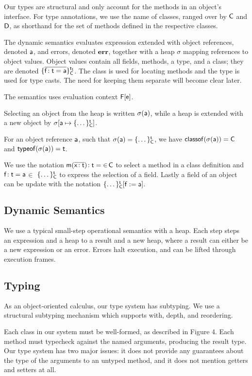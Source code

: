 \documentclass[preprint]{sigplanconf}
\newcommand{\m}{\M{\xt{m}}}
\newcommand{\e}{\M{\xt{e}}}
\newcommand{\f}{\M{\xt{f}}}
\newcommand{\x}{\M{\xt{x}}}
\renewcommand{\t}{\M{\xt{t}}}
\newcommand{\C}{\M{\xt{C}}}
\newcommand{\D}{\M{\xt{D}}}
\newcommand{\err}{\M{\bt{err}}}
\newcommand{\s}{\M{\sigma}}
\renewcommand{\a}{\M{\xt a}}
\newcommand{\F}{\M{\xt F}}
\newcommand{\tp}[1]{\M{ \t_{#1} }}
\newcommand{\HT}[2]{\M{{#1}\!:{#2}}}
\newcommand{\Mdef}[5]{\M{ \HT { #1( \b{\HT{#2}{#3}})}{#4}={#5}}}
\newcommand{\Fdef}[3]{\M{ \HT{#1}{#2}={#3} }}
\newcommand{\is}{\M{\mapsto}}
\newcommand{\Obj}[3]{ \M{\{ #1 \}^{#2}_{#3}}}
\newcommand{\Heap}[2]{\M{ #1[ #2 ] }}
\newcommand{\M}[1]{\ensuremath{#1}\xspace}
\newcommand{\xt}[1]{\sf{#1}}
\newcommand{\bt}[1]{\xt{\bf #1}}
\renewcommand{\b}[1]{\M{\overline{#1}}}
\newcommand{\inc}{\M{\in}}
\newcommand{\Update}[3]{\M{#1[ #2 := #3]}}
\newcommand{\Bind}[2]{\M{#1 \is #2}}
\newcommand{\classofis}[2]{\M{\xt{classof}(#1)=#2}}
\newcommand{\typeofis}[2]{\M{\xt{typeof}(#1)=#2}}
\newcommand{\Sel}[2]{\M{#1(#2)}}
\begin{document}
Our types are structural and only account for the methods in an object's
interface. For type annotations, we use the name of classes, ranged over by
\C and \D, as shorthand for the set of methods defined in the respective
classes.


The dynamic semantics evaluates expression extended with object references,
denoted \a, and errors, denoted \err, together with a heap \s mapping
references to object values. Object values contain all fields, methods, a
type, and a class; they are denoted \Obj{\b{\Fdef\f\t\a}}{\tp 1}{\C}. The
class is used for locating methods and the type is used for type casts. The
need for keeping them separate will become clear later.

The semantics uses evaluation context \M{\F[\e]}.

Selecting an object from the heap is written \Sel\s\a, while a heap is
extended with a new object by \Heap{\s}{\Bind{\a}{\Obj{\dots}\t\C}}.


For an object reference \a, such that \M{\Sel\s\a=\Obj{\dots}\t\C}, we have 
\classofis{\Sel\s\a}\C and \typeofis{\Sel\s\a}\t.

We use the notation \Mdef\m\x\t\t \inc\C to select a method in a class
definition and \Fdef\f\t\a\inc\Obj{\dots}\t\C to express the selection of a
field. Lastly a field of an object can be update with the notation
\Update{\Obj{\dots}\t\C}\f\a.


\subsection{Dynamic Semantics}

We use a typical small-step operational semantics with a heap. Each step steps an expression and a heap to a result and a new heap, where a result can either be a new expression or an error. Errors halt execution, and can be lifted through execution frames.

\subsection{Typing}

As an object-oriented calculus, our type system has subtyping. We use a structural subtyping mechanism which supports with, depth, and reordering. 

Each class in our system must be well-formed, as described in Figure 4. Each method must typecheck against the named arguments, producing the result type. Our type system has two major issues: it does not provide any guarantees about the type of the arguments to an untyped method, and it does not mention getters and setters at all.
\end{document}
